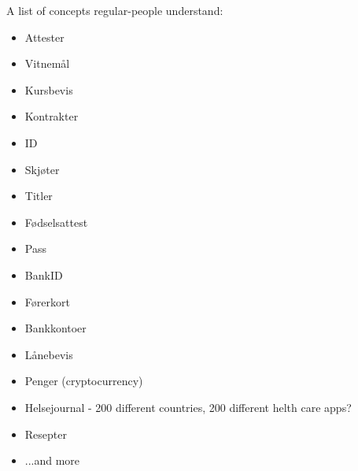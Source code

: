 A list of concepts regular-people understand:
\begin{itemize}
    \item Attester
    \item Vitnemål
    \item Kursbevis
    \item Kontrakter
    \item ID
    \item Skjøter
    \item Titler
    \item Fødselsattest
    \item Pass
    \item BankID
    \item Førerkort
    \item Bankkontoer
    \item Lånebevis
    \item Penger (cryptocurrency)
    \item Helsejournal - 200 different countries, 200 different helth care apps?
    \item Resepter
    \item ...and more
\end{itemize}
